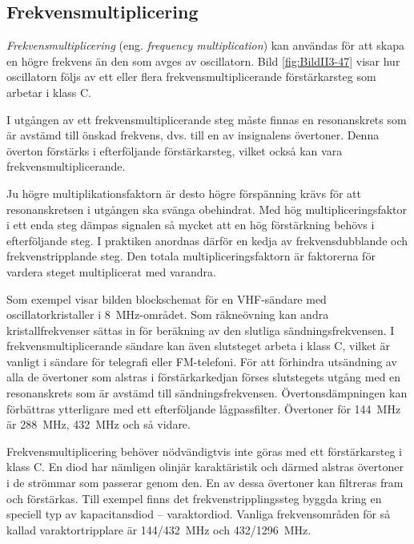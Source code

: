 \subsection{Frekvensmultiplicering}


\emph{Frekvensmultiplicering} (eng. \emph{frequency multiplication}) kan
användas för att skapa en högre frekvens än den som avges av oscillatorn.
Bild \ref{fig:BildII3-47} visar hur oscillatorn följs av ett eller flera
frekvensmultiplicerande förstärkarsteg som arbetar i klass C.

I utgången av ett frekvensmultiplicerande steg måste finnas en
resonanskrets som är avstämd till önskad frekvens, dvs. till en av insignalens övertoner.
Denna överton förstärks i efterföljande förstärkarsteg, vilket också kan vara
frekvensmultiplicerande.

Ju högre multiplikationsfaktorn är desto högre förspänning krävs för
att resonanskretsen i utgången ska svänga obehindrat.
Med hög multipliceringsfaktor i ett enda steg dämpas signalen så mycket att
en hög förstärkning behövs i efterföljande steg.
I praktiken anordnas därför en kedja av frekvensdubblande och
frekvenstripplande steg.
Den totala multipliceringsfaktorn är faktorerna för vardera steget
multiplicerat med varandra.

Som exempel visar bilden blockschemat för en VHF-sändare med
oscillatorkristaller i 8~MHz-området.
Som räkneövning kan andra kristallfrekvenser sättas in för beräkning av den
slutliga sändningsfrekvensen.
I frekvensmultiplicerande sändare kan även slutsteget arbeta i klass C, vilket
är vanligt i sändare för telegrafi eller FM-telefoni.
För att förhindra utsändning av alla de övertoner som alstras i
förstärkarkedjan förses slutstegets utgång med en resonanskrets som är
avstämd till sändningsfrekvensen.
Övertonsdämpningen kan förbättras ytterligare med ett efterföljande
lågpassfilter.
Övertoner för 144~MHz är 288~MHz, 432~MHz och så vidare.

Frekvensmultiplicering behöver nödvändigtvis inte göras med ett förstärkarsteg
i klass C.
En diod har nämligen olinjär karaktäristik och därmed alstras övertoner i
de strömmar som passerar genom den.
En av dessa övertoner kan filtreras fram och förstärkas.
Till exempel finns det frekvenstripplingssteg byggda kring en speciell typ av
kapacitansdiod -- varaktordiod.
Vanliga frekvensområden för så kallad varaktortripplare är 144/432~MHz och
432/1296~MHz.

